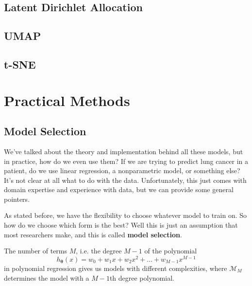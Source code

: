 \documentclass{article}
\begin{document}
  \subsection{Latent Dirichlet Allocation} 

  \subsection{UMAP}

  \subsection{t-SNE}

\section{Practical Methods} 

  \subsection{Model Selection} 

    We've talked about the theory and implementation behind all these models, but in practice, how do we even use them? If we are trying to predict lung cancer in a patient, do we use linear regression, a nonparametric model, or something else? It's not clear at all what to do with the data. Unfortunately, this just comes with domain expertise and experience with data, but we can provide some general pointers. 

    As stated before, we have the flexibility to choose whatever model to train on. So how do we choose which form is the best? Well this is just an assumption that most researchers make, and this is called \textbf{model selection}. 

    \begin{example}
      The number of terms $M$, i.e. the degree $M-1$ of the polynomial 
        \[h_{\boldsymbol{\theta}} (x) = w_0 + w_1 x + w_2 x^2 + \ldots + w_{M-1} x^{M-1}\]
      in polynomial regression gives us models with different complexities, where $\mathcal{M}_M$ determines the model with a $M-1$th degree polynomial. 
    \end{example}
\end{document}
